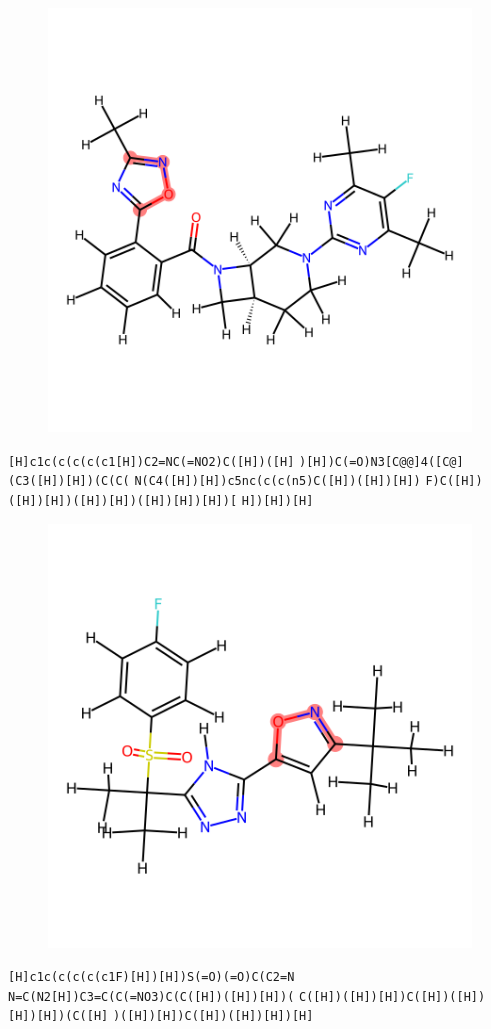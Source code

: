 \documentclass{article}
\begin{document}
\begin{figure}[ht]
\centering
    \includegraphics{mol116.png}
\end{figure}
\verb|[H]c1c(c(c(c(c1[H])C2=NC(=NO2)C([H])([H]| \verb|)[H])C(=O)N3[C@@]4([C@](C3([H])[H])(C(C(| \verb|N(C4([H])[H])c5nc(c(c(n5)C([H])([H])[H])| \verb|F)C([H])([H])[H])([H])[H])([H])[H])[H])[| \verb|H])[H])[H]|

\begin{figure}[ht]
\centering
    \includegraphics{mol117.png}
\end{figure}
\verb|[H]c1c(c(c(c(c1F)[H])[H])S(=O)(=O)C(C2=N| \verb|N=C(N2[H])C3=C(C(=NO3)C(C([H])([H])[H])(| \verb|C([H])([H])[H])C([H])([H])[H])[H])(C([H]| \verb|)([H])[H])C([H])([H])[H])[H]|
\end{document}
